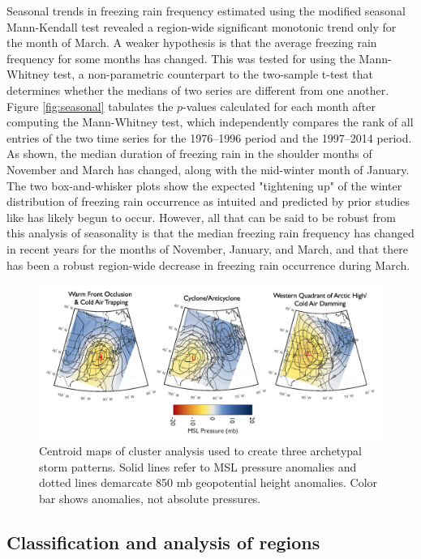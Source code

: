 \documentclass[twocol]{ametsoc}
\begin{document}
Seasonal trends in freezing rain frequency estimated using the modified seasonal Mann-Kendall test revealed a region-wide significant monotonic trend only for the month of March. A weaker hypothesis is that the average freezing rain frequency for some months has changed. This was tested for using the Mann-Whitney test, a non-parametric counterpart to the two-sample t-test that determines whether the medians of two series are different from one another. Figure \ref{fig:seasonal} tabulates the $p$-values calculated for each month after computing the Mann-Whitney test, which independently compares the rank of all entries of the two time series for the 1976--1996 period and the 1997--2014 period. As shown, the median duration of freezing rain in the shoulder months of November and March has changed, along with the mid-winter month of January. The two box-and-whisker plots show the expected "tightening up" of the winter distribution of freezing rain occurrence as intuited and predicted by prior studies like \citet{cheng2011possible} has likely begun to occur. However, all that can be said to be robust from this analysis of seasonality is that the median freezing rain frequency has changed in recent years for the months of November, January, and March, and that there has been a robust region-wide decrease in freezing rain occurrence during March.

\begin{figure}
\centering
\includegraphics[width=1\textwidth]{Cluster_Centroids.png}
\caption{\label{fig:centroids} Centroid maps of cluster analysis  used to create three archetypal storm patterns. Solid lines refer to MSL pressure anomalies and dotted lines demarcate 850 mb geopotential height anomalies. Color bar shows anomalies, not absolute pressures.}
\end{figure}

\subsection{Classification and analysis of regions}
\end{document}
